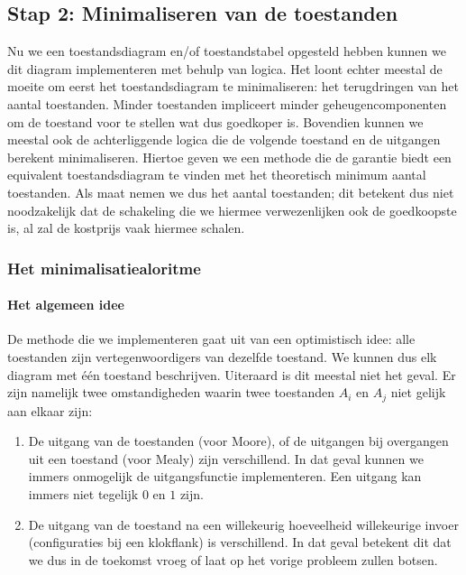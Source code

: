 \subsection{Stap 2: Minimaliseren van de toestanden}
Nu we een toestandsdiagram en/of toestandstabel opgesteld hebben kunnen we dit diagram implementeren met behulp van logica. Het loont echter meestal de moeite om eerst het toestandsdiagram te minimaliseren: het terugdringen van het aantal toestanden. Minder toestanden impliceert minder geheugencomponenten om de toestand voor te stellen wat dus goedkoper is. Bovendien kunnen we meestal ook de achterliggende logica die de volgende toestand en de uitgangen berekent minimaliseren. Hiertoe geven we een methode die de garantie biedt een equivalent toestandsdiagram te vinden met het theoretisch minimum aantal toestanden. Als maat nemen we dus het aantal toestanden; dit betekent dus niet noodzakelijk dat de schakeling die we hiermee verwezenlijken ook de goedkoopste is, al zal de kostprijs vaak hiermee schalen.

\subsubsection{Het minimalisatiealoritme}

\paragraph{Het algemeen idee}
De methode die we implementeren gaat uit van een optimistisch idee: alle toestanden zijn vertegenwoordigers van dezelfde toestand. We kunnen dus elk diagram met \'e\'en toestand beschrijven. Uiteraard is dit meestal niet het geval. Er zijn namelijk twee omstandigheden waarin twee toestanden $A_i$ en $A_j$ niet gelijk aan elkaar zijn:

\begin{enumerate}
 \item De uitgang van de toestanden (voor Moore), of de uitgangen bij overgangen uit een toestand (voor Mealy) zijn verschillend. In dat geval kunnen we immers onmogelijk de uitgangsfunctie implementeren. Een uitgang kan immers niet tegelijk $0$ en $1$ zijn.
 \item De uitgang van de toestand na een willekeurig hoeveelheid willekeurige invoer (configuraties bij een klokflank) is verschillend. In dat geval betekent dit dat we dus in de toekomst vroeg of laat op het vorige probleem zullen botsen.
\end{enumerate}

